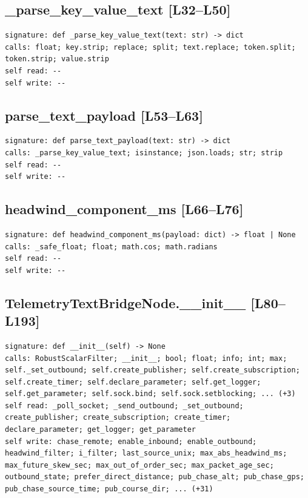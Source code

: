 \documentclass[a4paper,10pt,oneside]{book}
\begin{document}
\subsection*{\_parse\_key\_value\_text [L32--L50]}
\begin{lstlisting}[numbers=none]
signature: def _parse_key_value_text(text: str) -> dict
calls: float; key.strip; replace; split; text.replace; token.split; token.strip; value.strip
self read: --
self write: --
\end{lstlisting}
\subsection*{parse\_text\_payload [L53--L63]}
\begin{lstlisting}[numbers=none]
signature: def parse_text_payload(text: str) -> dict
calls: _parse_key_value_text; isinstance; json.loads; str; strip
self read: --
self write: --
\end{lstlisting}
\subsection*{headwind\_component\_ms [L66--L76]}
\begin{lstlisting}[numbers=none]
signature: def headwind_component_ms(payload: dict) -> float | None
calls: _safe_float; float; math.cos; math.radians
self read: --
self write: --
\end{lstlisting}
\subsection*{TelemetryTextBridgeNode.\_\_init\_\_ [L80--L193]}
\begin{lstlisting}[numbers=none]
signature: def __init__(self) -> None
calls: RobustScalarFilter; __init__; bool; float; info; int; max; self._set_outbound; self.create_publisher; self.create_subscription; self.create_timer; self.declare_parameter; self.get_logger; self.get_parameter; self.sock.bind; self.sock.setblocking; ... (+3)
self read: _poll_socket; _send_outbound; _set_outbound; create_publisher; create_subscription; create_timer; declare_parameter; get_logger; get_parameter
self write: chase_remote; enable_inbound; enable_outbound; headwind_filter; i_filter; last_source_unix; max_abs_headwind_ms; max_future_skew_sec; max_out_of_order_sec; max_packet_age_sec; outbound_state; prefer_direct_distance; pub_chase_alt; pub_chase_gps; pub_chase_source_time; pub_course_dir; ... (+31)
\end{lstlisting}
\end{document}
